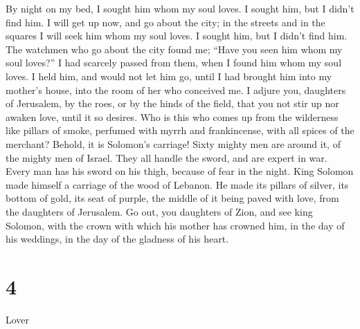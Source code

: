  By night on my bed, I sought him whom my soul loves. I
sought him, but I didn't find him.  I will get up now, and
go about the city; in the streets and in the squares I will seek him
whom my soul loves. I sought him, but I didn't find him. 
The watchmen who go about the city found me; ``Have you seen him whom my
soul loves?''  I had scarcely passed from them, when I
found him whom my soul loves. I held him, and would not let him go,
until I had brought him into my mother's house, into the room of her who
conceived me.  I adjure you, daughters of Jerusalem, by
the roes, or by the hinds of the field, that you not stir up nor awaken
love, until it so desires.  Who is this who comes up from
the wilderness like pillars of smoke, perfumed with myrrh and
frankincense, with all spices of the merchant?  Behold, it
is Solomon's carriage! Sixty mighty men are around it, of the mighty men
of Israel.  They all handle the sword, and are expert in
war. Every man has his sword on his thigh, because of fear in the night.
 King Solomon made himself a carriage of the wood of
Lebanon.  He made its pillars of silver, its bottom of
gold, its seat of purple, the middle of it being paved with love, from
the daughters of Jerusalem.  Go out, you daughters of
Zion, and see king Solomon, with the crown with which his mother has
crowned him, in the day of his weddings, in the day of the gladness of
his heart.

\hypertarget{section-3}{%
\section{4}\label{section-3}}

Lover

